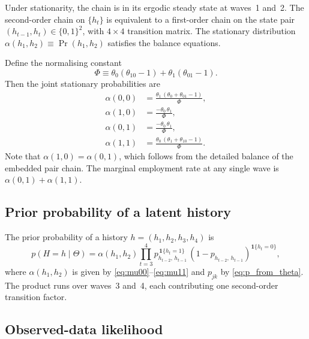 \documentclass[12pt]{article}
\begin{document}
Under stationarity, the chain is in its ergodic steady state at waves~1
and~2. The second-order chain on $\{h_t\}$ is equivalent to a
first-order chain on the state pair $(h_{t-1}, h_t) \in \{0,1\}^2$,
with $4 \times 4$ transition matrix. The stationary distribution
$\alpha(h_1, h_2) \equiv \Pr(h_1, h_2)$ satisfies the balance equations.

Define the normalising constant
\begin{equation}
\Phi \equiv \theta_0(\theta_{10} - 1) + \theta_1(\theta_{01} - 1).
\label{eq:Phi}
\end{equation}
Then the joint stationary probabilities are
\begin{align}
\alpha(0, 0) &= \frac{\theta_1\,(\theta_0 + \theta_{01} - 1)}{\Phi},
\label{eq:mu00} \\[4pt]
\alpha(1, 0) &= \frac{-\theta_0\,\theta_1}{\Phi},
\label{eq:mu10} \\[4pt]
\alpha(0, 1) &= \frac{-\theta_0\,\theta_1}{\Phi},
\label{eq:mu01} \\[4pt]
\alpha(1, 1) &= \frac{\theta_0\,(\theta_1 + \theta_{10} - 1)}{\Phi}.
\label{eq:mu11}
\end{align}
Note that $\alpha(1,0) = \alpha(0,1)$, which follows from the detailed
balance of the embedded pair chain. The marginal employment rate at
any single wave is $\alpha(0,1) + \alpha(1,1)$.

\subsection{Prior probability of a latent history}

The prior probability of a history $h = (h_1, h_2, h_3, h_4)$ is
\begin{equation}
p(H = h \mid \Theta) =
\alpha(h_1, h_2)
\prod_{t=3}^{4}
p_{h_{t-2},\, h_{t-1}}^{\,\mathbf{1}\{h_t = 1\}}\,
(1 - p_{h_{t-2},\, h_{t-1}})^{\mathbf{1}\{h_t = 0\}},
\label{eq:ar2_prior}
\end{equation}
where $\alpha(h_1, h_2)$ is given by
\eqref{eq:mu00}--\eqref{eq:mu11} and $p_{jk}$ by
\eqref{eq:p_from_theta}. The product runs over waves~3 and~4, each
contributing one second-order transition factor.

\subsection{Observed-data likelihood}
\end{document}
